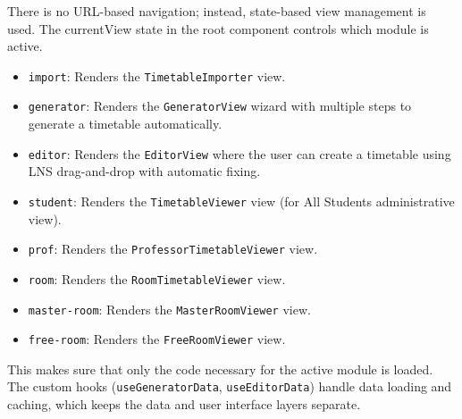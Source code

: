 There is no URL-based navigation; instead, state-based view management is used. The currentView state in the root component controls which module is active.

\begin{itemize}

    \item \texttt{import}: Renders the \texttt{TimetableImporter} view.

    \item \texttt{generator}: Renders the \texttt{GeneratorView} wizard with multiple steps to generate a timetable automatically.

    \item \texttt{editor}: Renders the \texttt{EditorView} where the user can create a timetable using LNS drag-and-drop with automatic fixing.

    \item \texttt{student}: Renders the \texttt{TimetableViewer} view (for All Students administrative view).

    \item \texttt{prof}: Renders the \texttt{ProfessorTimetableViewer} view.

    \item \texttt{room}: Renders the \texttt{RoomTimetableViewer} view.

    \item \texttt{master-room}: Renders the \texttt{MasterRoomViewer} view.

    \item \texttt{free-room}: Renders the \texttt{FreeRoomViewer} view.
\end{itemize}

This makes sure that only the code necessary for the active module is loaded. The custom hooks (\texttt{useGeneratorData}, \texttt{useEditorData}) handle data loading and caching, which keeps the data and user interface layers separate.